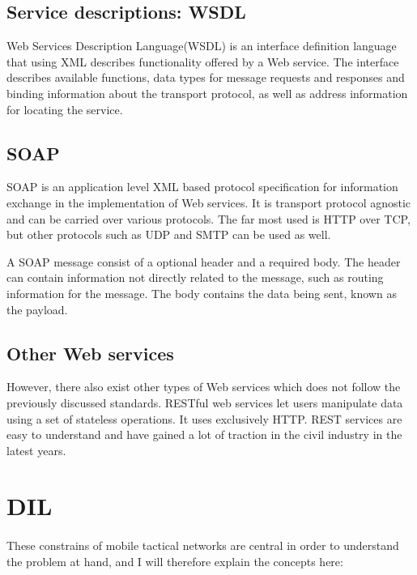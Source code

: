 \documentclass[USenglish]{ifimaster}
\begin{document}
\subsection{Service descriptions: WSDL}
Web Services Description Language(WSDL) is an interface definition language that using XML describes functionality offered by a Web service. The interface describes available functions, data types for message requests and responses and binding information about the transport protocol, as well as address information for locating the service.

\subsection{SOAP}
SOAP is an application level XML based protocol specification for information exchange in the implementation of Web services. It is transport protocol agnostic and can be carried over various protocols. The far most used is HTTP over TCP, but other protocols such as UDP and SMTP can be used as well.

A SOAP message consist of a optional header and a required body. The header can contain information not directly related to the message, such as routing information for the message. The body contains the data being sent, known as the payload.

\subsection{Other Web services}
However, there also exist other types of Web services which does not follow the previously discussed standards. RESTful web services let users manipulate data using a set of stateless operations. It uses exclusively HTTP. REST services are easy to understand and have gained a lot of traction in the civil industry in the latest years.



\section{DIL}
\label{dil}
\paragraph{}
These constrains of mobile tactical networks are central in order to understand the problem at hand, and I will therefore explain the concepts here:
\end{document}
